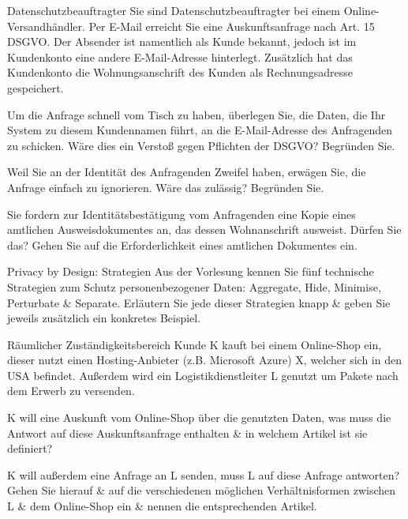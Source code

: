 \documentclass{exercisesheet}
\begin{document}
\begin{eexercises}{Datenschutzbeauftragter}{
    Sie sind Datenschutzbeauftragter bei einem Online-Versandhändler. Per E-Mail erreicht Sie eine Auskunftsanfrage nach Art. 15 DSGVO. Der Absender ist namentlich als Kunde bekannt, jedoch ist im Kundenkonto eine andere E-Mail-Adresse hinterlegt. Zusätzlich hat das Kundenkonto die Wohnungsanschrift des Kunden als Rechnungsadresse gespeichert.
  }
  \item Um die Anfrage schnell vom Tisch zu haben, überlegen Sie, die Daten, die Ihr System zu diesem Kundennamen führt, an die E-Mail-Adresse des Anfragenden zu schicken. Wäre dies ein Verstoß gegen Pflichten der DSGVO? Begründen Sie.
  \item Weil Sie an der Identität des Anfragenden Zweifel haben, erwägen Sie, die Anfrage einfach zu ignorieren. Wäre das zulässig? Begründen Sie.
  \item Sie fordern zur Identitätsbestätigung vom Anfragenden eine Kopie eines amtlichen Ausweisdokumentes an, das dessen Wohnanschrift ausweist. Dürfen Sie das? Gehen Sie auf die Erforderlichkeit eines amtlichen Dokumentes ein.
\end{eexercises}

\begin{exercise}{Privacy by Design: Strategien}
  Aus der Vorlesung kennen Sie fünf technische Strategien zum Schutz personenbezogener Daten: Aggregate, Hide, Minimise, Perturbate \& Separate.
  Erläutern Sie jede dieser Strategien knapp \& geben Sie jeweils zusätzlich ein konkretes Beispiel.
\end{exercise}

\begin{eexercises}{Räumlicher Zuständigkeitsbereich}{
    Kunde K kauft bei einem Online-Shop ein, dieser nutzt einen Hosting-Anbieter (z.B. Microsoft Azure) X, welcher sich in den USA befindet. Außerdem wird ein Logistikdienstleiter L genutzt um Pakete nach dem Erwerb zu versenden.
  }
  \item K will eine Auskunft vom Online-Shop über die genutzten Daten, was muss die Antwort auf diese Auskunftsanfrage enthalten \& in welchem Artikel ist sie definiert?
  \item K will außerdem eine Anfrage an L senden, muss L auf diese Anfrage antworten? Gehen Sie hierauf \& auf die verschiedenen möglichen Verhältnisformen zwischen L \& dem Online-Shop ein \& nennen die entsprechenden Artikel.
\end{eexercises}
\end{document}
